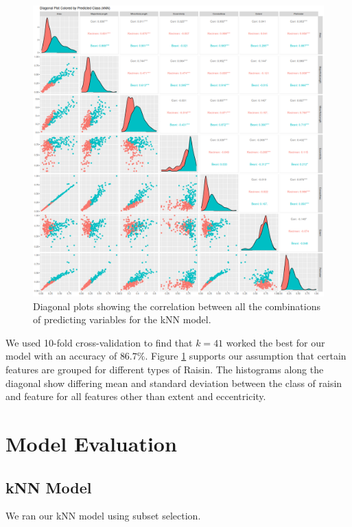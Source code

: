 \documentclass{article}
\begin{document}
\begin{figure}[h]
    \centering
    \includegraphics[width=1\linewidth]{knn_pairs_plot}
    \caption{Diagonal plots showing the correlation between all the combinations of predicting variables for the kNN model.}
    \label{fig:diagPlot}
\end{figure}

\vspace{5mm}

\noindent We used 10-fold cross-validation to find that $k = 41$ worked the best for our model with an accuracy of $86.7\%$. Figure \ref{fig:diagPlot} supports our assumption that certain features are grouped for different types of Raisin. The histograms along the diagonal show differing mean and standard deviation between the class of raisin and feature for all features other than extent and eccentricity. 


\clearpage

\section*{Model Evaluation}

\subsection*{kNN Model}
We ran our kNN model using subset selection.
\end{document}
